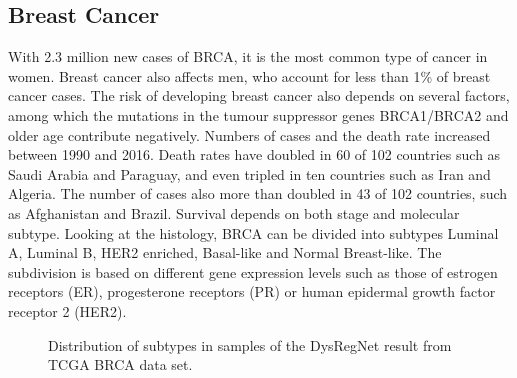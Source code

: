 \documentclass[pdftex,12pt,a4paper]{report}
\begin{document}
\subsection{Breast Cancer}
\label{breast cancer}
With 2.3 million new cases of BRCA, it is the most common type of cancer in women\cite{brca_general}. Breast cancer also affects men, who account for less than 1\% of breast cancer cases. The risk of developing breast cancer also depends on several factors, among which the mutations in the tumour suppressor genes BRCA1/BRCA2 and older age contribute negatively. Numbers of cases and the death rate increased between 1990 and 2016. Death rates have doubled in 60 of 102 countries such as Saudi Arabia and Paraguay, and even tripled in ten countries such as Iran and Algeria. The number of cases also more than doubled in 43 of 102 countries, such as Afghanistan and Brazil\cite{brca_history}. Survival depends on both stage and molecular subtype. Looking at the histology, BRCA can be divided into subtypes Luminal A, Luminal B, HER2 enriched, Basal-like and Normal Breast-like. The subdivision is based on different gene expression levels such as those of estrogen receptors (ER), progesterone receptors (PR) or human epidermal growth factor receptor 2 (HER2).
\begin{figure}[!ht]
\begin{center}
	\caption{Distribution of subtypes in samples of the DysRegNet result from TCGA BRCA data set.}
	\label{subtypes}
\end{center}
\end{figure}
\end{document}
